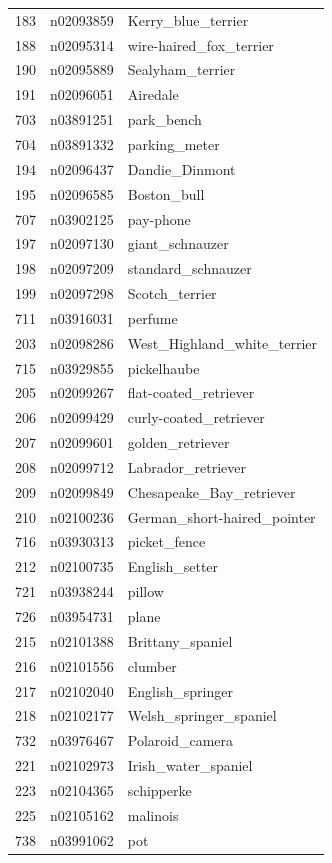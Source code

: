 \begin{table}
\begin{tabular}{cll}
183 & n02093859 & Kerry_blue_terrier \\
188 & n02095314 & wire-haired_fox_terrier \\
190 & n02095889 & Sealyham_terrier \\
191 & n02096051 & Airedale \\
703 & n03891251 & park_bench \\
704 & n03891332 & parking_meter \\
194 & n02096437 & Dandie_Dinmont \\
195 & n02096585 & Boston_bull \\
707 & n03902125 & pay-phone \\
197 & n02097130 & giant_schnauzer \\
198 & n02097209 & standard_schnauzer \\
199 & n02097298 & Scotch_terrier \\
711 & n03916031 & perfume \\
203 & n02098286 & West_Highland_white_terrier \\
715 & n03929855 & pickelhaube \\
205 & n02099267 & flat-coated_retriever \\
206 & n02099429 & curly-coated_retriever \\
207 & n02099601 & golden_retriever \\
208 & n02099712 & Labrador_retriever \\
209 & n02099849 & Chesapeake_Bay_retriever \\
210 & n02100236 & German_short-haired_pointer \\
716 & n03930313 & picket_fence \\
212 & n02100735 & English_setter \\
721 & n03938244 & pillow \\
726 & n03954731 & plane \\
215 & n02101388 & Brittany_spaniel \\
216 & n02101556 & clumber \\
217 & n02102040 & English_springer \\
218 & n02102177 & Welsh_springer_spaniel \\
732 & n03976467 & Polaroid_camera \\
221 & n02102973 & Irish_water_spaniel \\
223 & n02104365 & schipperke \\
225 & n02105162 & malinois \\
738 & n03991062 & pot \\

\end{tabular}
\end{table}
